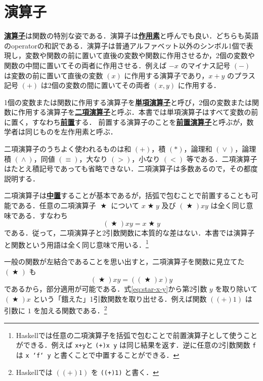 \documentclass[a4paper,twocolumn]{jsbook}
\newcommand{\programminglanguage}[1]{\textsf{#1}}
\newcommand{\haskell}{\programminglanguage{Haskell}}
\newcommand{\keyword}[1]{{\underline{\textbf{#1}}}}
\newcommand{\code}[1]{\texttt{#1}}
\DeclareMathOperator{\mBinOp}{\bigstar}
\DeclareMathOperator{\mLogicalAnd}{\wedge}
\DeclareMathOperator{\mLogicalOr}{\vee}
\begin{document}
\section{演算子}

\keyword{演算子}は関数の特別な姿である．演算子は\keyword{作用素}と呼んでも良い．どちらも英語のoperatorの和訳である．演算子は普通アルファベット以外のシンボル1個で表現し，変数や関数の前に置いて直後の変数や関数に作用させるか，2個の変数や関数の中間に置いてその両者に作用させる．例えば $-x$ のマイナス記号 $(-)$ は変数の前に置いて直後の変数 $(x)$ に作用する演算子であり，$x+y$ のプラス記号 $(+)$ は2個の変数の間に置いてその両者 $(x,y)$ に作用する．

1個の変数または関数に作用する演算子を\keyword{単項演算子}と呼び，2個の変数または関数に作用する演算子を\keyword{二項演算子}と呼ぶ．本書では単項演算子はすべて変数の前に置く，すなわち\keyword{前置}する．
前置する演算子のことを\keyword{前置演算子}と呼ぶが，数学者は同じものを左作用素と呼ぶ．

二項演算子のうちよく使われるものは和 $(+)$，積 $(*)$，論理和 $(\mLogicalOr)$，論理積 $(\mLogicalAnd)$，同値 $(\equiv)$，大なり $(>)$，小なり $(<)$ 等である．二項演算子はたとえ積記号であっても省略できない．二項演算子は多数あるので，その都度説明する．

二項演算子は\keyword{中置}することが基本であるが，括弧で包むことで前置することも可能である．任意の二項演算子 $\mBinOp$ について $x\mBinOp y$ 及び $(\mBinOp)xy$ は全く同じ意味である．すなわち
\begin{equation}
\left(\mBinOp\right)xy=x\mBinOp y
\end{equation}
である．従って，二項演算子と2引数関数に本質的な差はない．本書では演算子と関数という用語は全く同じ意味で用いる．\footnote{\haskell では任意の二項演算子を括弧で包むことで前置演算子として使うことができる．例えば \code{x+y}と \code{(+)x y} は同じ結果を返す．逆に任意の2引数関数 \code{f}は \code{x `f` y} と書くことで中置することができる．}

一般の関数が左結合であることを思い出すと，二項演算子を関数に見立てた $(\mBinOp)$ も
\begin{equation}
\label{eq:star-x-y}
(\mBinOp)xy=((\mBinOp)x)y
\end{equation}
であるから，部分適用が可能である．式\eqref{eq:star-x-y}から第2引数 $y$ を取り除いて $(\mBinOp)x$ という「餓えた」1引数関数を取り出せる．例えば関数 $((+)1)$ は引数に $1$ を加える関数である．\footnote{\haskell では $((+)1)$ を \code{((+)1)} と書く．}
\end{document}
